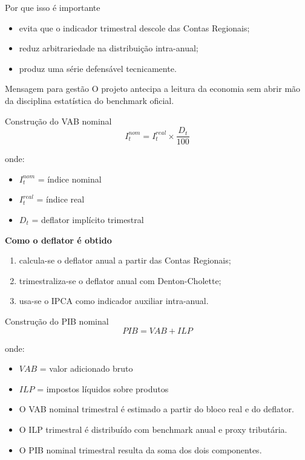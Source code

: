 \documentclass[aspectratio=169,11pt]{beamer}
\begin{document}
\begin{frame}{Por que isso é importante}
\begin{itemize}
  \item evita que o indicador trimestral descole das Contas Regionais;
  \item reduz arbitrariedade na distribuição intra-anual;
  \item produz uma série defensável tecnicamente.
\end{itemize}

\begin{alertblock}{Mensagem para gestão}
O projeto antecipa a leitura da economia sem abrir mão da disciplina estatística do benchmark oficial.
\end{alertblock}
\end{frame}

\begin{frame}{Construção do VAB nominal}
\[
I_t^{nom} = I_t^{real} \times \frac{D_t}{100}
\]

onde:
\begin{itemize}
  \item \(I_t^{nom}\) = índice nominal
  \item \(I_t^{real}\) = índice real
  \item \(D_t\) = deflator implícito trimestral
\end{itemize}

\textbf{Como o deflator é obtido}
\begin{enumerate}
  \item calcula-se o deflator anual a partir das Contas Regionais;
  \item trimestraliza-se o deflator anual com Denton-Cholette;
  \item usa-se o IPCA como indicador auxiliar intra-anual.
\end{enumerate}
\end{frame}

\begin{frame}{Construção do PIB nominal}
\[
PIB = VAB + ILP
\]

onde:
\begin{itemize}
  \item \(VAB\) = valor adicionado bruto
  \item \(ILP\) = impostos líquidos sobre produtos
\end{itemize}

\begin{itemize}
  \item O VAB nominal trimestral é estimado a partir do bloco real e do deflator.
  \item O ILP trimestral é distribuído com benchmark anual e proxy tributária.
  \item O PIB nominal trimestral resulta da soma dos dois componentes.
\end{itemize}
\end{frame}
\end{document}
